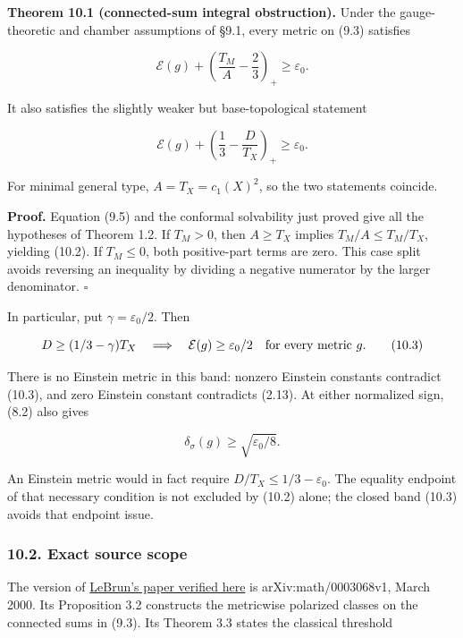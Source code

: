 \documentclass[
  10pt,
]{article}
\begin{document}
\textbf{Theorem 10.1 (connected-sum integral obstruction).} Under the
gauge-theoretic and chamber assumptions of §9.1, every metric on (9.3)
satisfies

\[
 \mathcal E(g)+\left(\frac{T_M}{A}-\frac23\right)_+
                         \ge\varepsilon_0.               \tag{10.1}
\]

It also satisfies the slightly weaker but base-topological statement

\[
 \boxed{\displaystyle
 \mathcal E(g)+\left(\frac13-\frac{D}{T_X}\right)_+
                         \ge\varepsilon_0.}              \tag{10.2}
\]

For minimal general type, \(A=T_X=c_1(X)^2\), so the two statements
coincide.

\textbf{Proof.} Equation (9.5) and the conformal solvability just proved
give all the hypotheses of Theorem 1.2. If \(T_M>0\), then \(A\ge T_X\)
implies \(T_M/A\le T_M/T_X\), yielding (10.2). If \(T_M\le0\), both
positive-part terms are zero. This case split avoids reversing an
inequality by dividing a negative numerator by the larger denominator.
\(\square\)

In particular, put \(\gamma=\varepsilon_0/2\). Then

\[
             D\ge(1/3-\gamma)T_X
 \quad\Longrightarrow\quad
             \mathcal E(g)\ge\varepsilon_0/2
             \quad\hbox{for every metric }g.             \tag{10.3}
\]

There is no Einstein metric in this band: nonzero Einstein constants
contradict (10.3), and zero Einstein constant contradicts (2.13). At
either normalized sign, (8.2) also gives

\[
                    \delta_\sigma(g)\ge\sqrt{\varepsilon_0/8}.
 \tag{10.4}
\]

An Einstein metric would in fact require \(D/T_X\le1/3-\varepsilon_0\).
The equality endpoint of that necessary condition is not excluded by
(10.2) alone; the closed band (10.3) avoids that endpoint issue.

\hypertarget{exact-source-scope}{%
\subsubsection{10.2. Exact source scope}\label{exact-source-scope}}

The version of \href{https://arxiv.org/pdf/math/0003068}{LeBrun's paper
verified here} is arXiv:math/0003068v1, March 2000. Its Proposition 3.2
constructs the metricwise polarized classes on the connected sums in
(9.3). Its Theorem 3.3 states the classical threshold
\end{document}
